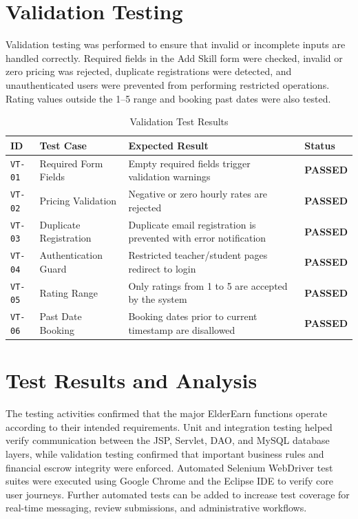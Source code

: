 \documentclass[12pt,a4paper]{report}
\begin{document}
\section{Validation Testing}
Validation testing was performed to ensure that invalid or incomplete inputs are handled correctly. Required fields in the Add Skill form were checked, invalid or zero pricing was rejected, duplicate registrations were detected, and unauthenticated users were prevented from performing restricted operations. Rating values outside the 1--5 range and booking past dates were also tested.

\begin{table}[H]
\centering
\small
\caption{Validation Test Results}
\label{tab:validation_test_results}
\begin{tabularx}{\textwidth}{|L{1.8cm}|L{4.2cm}|J|C{2.0cm}|}
\hline
\textbf{ID} & \textbf{Test Case} & \textbf{Expected Result} & \textbf{Status} \\ \hline
\texttt{VT-01} & Required Form Fields & Empty required fields trigger validation warnings & \textbf{PASSED} \\ \hline
\texttt{VT-02} & Pricing Validation & Negative or zero hourly rates are rejected & \textbf{PASSED} \\ \hline
\texttt{VT-03} & Duplicate Registration & Duplicate email registration is prevented with error notification & \textbf{PASSED} \\ \hline
\texttt{VT-04} & Authentication Guard & Restricted teacher/student pages redirect to login & \textbf{PASSED} \\ \hline
\texttt{VT-05} & Rating Range & Only ratings from 1 to 5 are accepted by the system & \textbf{PASSED} \\ \hline
\texttt{VT-06} & Past Date Booking & Booking dates prior to current timestamp are disallowed & \textbf{PASSED} \\ \hline
\end{tabularx}
\end{table}

\section{Test Results and Analysis}
The testing activities confirmed that the major ElderEarn functions operate according to their intended requirements. Unit and integration testing helped verify communication between the JSP, Servlet, DAO, and MySQL database layers, while validation testing confirmed that important business rules and financial escrow integrity were enforced. Automated Selenium WebDriver test suites were executed using Google Chrome and the Eclipse IDE to verify core user journeys. Further automated tests can be added to increase test coverage for real-time messaging, review submissions, and administrative workflows.
\end{document}
